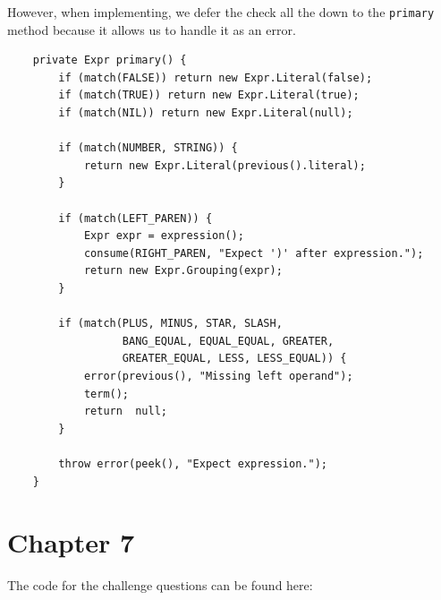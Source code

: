 \documentclass{article}
\begin{document}
\begin{enumerate}
            However, when implementing, we defer the check all the down to the 
            \verb|primary| method because it allows us to handle it as an error.

            \begin{verbatim}
    private Expr primary() {
        if (match(FALSE)) return new Expr.Literal(false);
        if (match(TRUE)) return new Expr.Literal(true);
        if (match(NIL)) return new Expr.Literal(null);

        if (match(NUMBER, STRING)) {
            return new Expr.Literal(previous().literal);
        }

        if (match(LEFT_PAREN)) {
            Expr expr = expression();
            consume(RIGHT_PAREN, "Expect ')' after expression.");
            return new Expr.Grouping(expr);
        }

        if (match(PLUS, MINUS, STAR, SLASH, 
                  BANG_EQUAL, EQUAL_EQUAL, GREATER, 
                  GREATER_EQUAL, LESS, LESS_EQUAL)) {
            error(previous(), "Missing left operand");
            term();
            return  null;
        }

        throw error(peek(), "Expect expression.");
    }
            \end{verbatim}

\end{enumerate}

\section*{Chapter 7}
The code for the challenge questions can be found here: 
\end{document}
